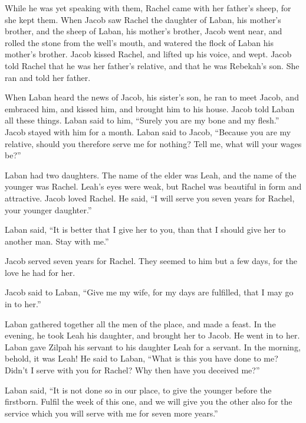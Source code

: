  While he was yet speaking with them, Rachel came with her
father's sheep, for she kept them.  When Jacob saw Rachel
the daughter of Laban, his mother's brother, and the sheep of Laban, his
mother's brother, Jacob went near, and rolled the stone from the well's
mouth, and watered the flock of Laban his mother's brother.
 Jacob kissed Rachel, and lifted up his voice, and wept.
 Jacob told Rachel that he was her father's relative, and
that he was Rebekah's son. She ran and told her father.

 When Laban heard the news of Jacob, his sister's son, he
ran to meet Jacob, and embraced him, and kissed him, and brought him to
his house. Jacob told Laban all these things.  Laban said
to him, ``Surely you are my bone and my flesh.'' Jacob stayed with him
for a month.  Laban said to Jacob, ``Because you are my
relative, should you therefore serve me for nothing? Tell me, what will
your wages be?''

 Laban had two daughters. The name of the elder was Leah,
and the name of the younger was Rachel.  Leah's eyes were
weak, but Rachel was beautiful in form and attractive. 
Jacob loved Rachel. He said, ``I will serve you seven years for Rachel,
your younger daughter.''

 Laban said, ``It is better that I give her to you, than
that I should give her to another man. Stay with me.''

 Jacob served seven years for Rachel. They seemed to him
but a few days, for the love he had for her.

 Jacob said to Laban, ``Give me my wife, for my days are
fulfilled, that I may go in to her.''

 Laban gathered together all the men of the place, and made
a feast.  In the evening, he took Leah his daughter, and
brought her to Jacob. He went in to her.  Laban gave Zilpah
his servant to his daughter Leah for a servant.  In the
morning, behold, it was Leah! He said to Laban, ``What is this you have
done to me? Didn't I serve with you for Rachel? Why then have you
deceived me?''

 Laban said, ``It is not done so in our place, to give the
younger before the firstborn.  Fulfil the week of this one,
and we will give you the other also for the service which you will serve
with me for seven more years.''

